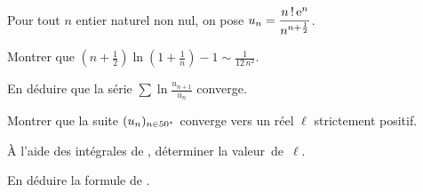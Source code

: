 \begin{exercice}
Pour tout $n$ entier naturel non nul, on pose $\displaystyle u_n = \frac{n\,! \, \mathrm{e}^n}{n^{n + \frac{1}{2}}}$.
\begin{questions}
\item Montrer que $\left(n + \frac{1}{2}\right) \ln\mathopen{}\left(1 + \frac{1}{n}\right) - 1\sim \frac{1}{12 \, n^2}$.

\item En déduire que la série $\sum \ln \frac{u_{n+1}}{u_n}$ converge.

\item Montrer que la suite $(u_n)_{n\in50^\star}$ converge vers un réel $\ell$ strictement positif.

\item À l'aide des intégrales de , déterminer la valeur~de~$\ell$.

\item En déduire la formule de .
\end{questions}
\end{exercice}

